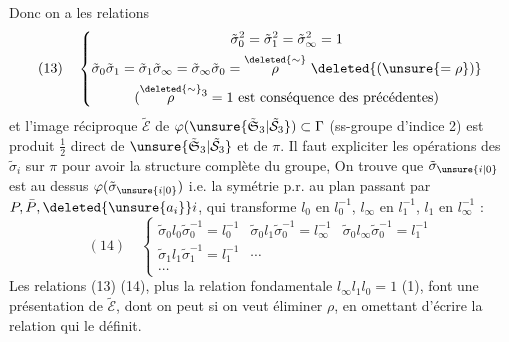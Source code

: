 Donc on a les relations
\[
(13)\quad\left\{\begin{gathered}
\tilde\sigma_0^2=\tilde\sigma_1^2=\tilde\sigma_\infty^2=1\\
\tilde\sigma_0\tilde\sigma_1=\tilde\sigma_1\tilde\sigma_\infty=\tilde\sigma_\infty\tilde\sigma_0
=\overset{\deleted{\sim}}{\rho}\ \deleted{(\unsure{=\rho})}\\
(\overset{\deleted{\sim}}{\rho}{}^3=1\text{ est conséquence des précédentes})
\end{gathered}\right.
\]
et l'image réciproque $\tilde{\mathcal E}$ de $\varphi(\unsure{\tilde{\mathfrak S}_3|\tilde{\mathcal S}_3})\subset\Gamma$ (ss-groupe d'indice 2) est produit $\frac12$ direct de $\unsure{\tilde{\mathfrak S}_3|\tilde{\mathcal S}_3}$ et de $\pi$. Il faut expliciter les opérations des $\tilde\sigma_i$ sur $\pi$ pour avoir la structure complète du groupe, On trouve que $\tilde\sigma_{\unsure{i|0}}$ est au dessus $\varphi(\tilde\sigma_{\unsure{i|0}})$ i.e. la symétrie p.r. au plan passant par $P,\bar P,\deleted{\unsure{a_i}}i$, qui transforme $l_0$ en $l_0^{-1}$, $l_\infty$ en $l_1^{-1}$, $l_1$ en $l_\infty^{-1}$ :
\[
(14)\quad\left\{\begin{array}{lll}
\tilde\sigma_0l_0\tilde\sigma_0^{-1}=l_0^{-1}&
\tilde\sigma_0l_1\tilde\sigma_0^{-1}=l_\infty^{-1}&
\tilde\sigma_0l_\infty\tilde\sigma_0^{-1}=l_1^{-1}\\
\tilde\sigma_1l_1\tilde\sigma_1^{-1}=l_1^{-1}&\cdots&\\
\cdots&&
\end{array}\right.
\]
Les relations (13) (14), plus la relation fondamentale $l_\infty l_1l_0=1$ (1), font une présentation de $\tilde{\mathcal E}$, dont on peut si on veut éliminer $\rho$, en omettant d'écrire la relation qui le définit.

